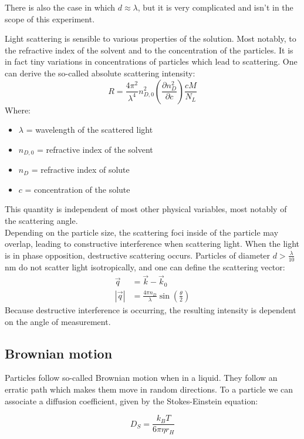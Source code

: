 \documentclass{article}
\begin{document}
There is also the case in which $d \approx \lambda$, but it is very complicated and isn't in the scope of this experiment.

Light scattering is sensible to various properties of the solution. Most notably, to the refractive index of the solvent and to the concentration of the particles. It is in fact tiny variations in concentrations of particles which lead to scattering. One can derive the so-called absolute scattering intensity:
\begin{equation}
    R = \frac{4\pi^2}{\lambda^4}n_{D,0}^2 \left( \frac{\partial n_D^2}{\partial c} \right) \frac{cM}{N_L}
\end{equation}
Where:
\begin{itemize}
    \item $\lambda$ = wavelength of the scattered light
    \item $n_{D,0}$ = refractive index of the solvent
    \item $n_D$ = refractive index of solute
    \item $c$ = concentration of the solute
\end{itemize}
This quantity is independent of most other physical variables, most notably of the scattering angle. \\

Depending on the particle size, the scattering foci inside of the particle may overlap, leading to constructive interference when scattering light. When the light is in phase opposition, destructive scattering occurs.
Particles of diameter $d > \frac{\lambda}{10}$ nm do not scatter light isotropically, and one can define the scattering vector:
\begin{align}
    \Vec{q} &= \Vec{k} - \Vec{k}_0\\
    |\Vec{q}| &= \frac{4 \pi n_D}{\lambda} \sin\left(\frac{\theta}{2}\right)
\end{align}
Because destructive interference is occurring, the resulting intensity is dependent on the angle of measurement.

\subsection{Brownian motion}
Particles follow so-called Brownian motion when in a liquid. They follow an erratic path which makes them move in random directions. To a particle we can associate a diffusion coefficient, given by the Stokes-Einstein equation:

\begin{equation}
    D_S = \frac{k_B T}{6 \pi \eta r_H}
\end{equation}
\end{document}
